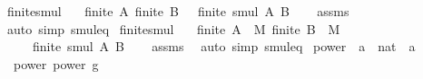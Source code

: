 \begin{isabellebody}
\endisatagproof
{\isafoldproof}%
%
\isadelimproof
\isanewline
%
\endisadelimproof
\isanewline
{}\isamarkupfalse%
\ finite{\isacharunderscore}{\kern0pt}smul{\isacharcolon}{\kern0pt}\isanewline
\ \ \ {\isachardoublequoteopen}finite\ A{\isachardoublequoteclose}\ {\isachardoublequoteopen}finite\ B{\isachardoublequoteclose}\ \ \ {\isachardoublequoteopen}finite\ {\isacharparenleft}{\kern0pt}smul\ A\ B{\isacharparenright}{\kern0pt}{\isachardoublequoteclose}\isanewline
%
\isadelimproof
\ \ %
\endisadelimproof
%
\isatagproof
{}\isamarkupfalse%
\ assms\ \isamarkupfalse%
\ {\isacharparenleft}{\kern0pt}auto\ simp{\isacharcolon}{\kern0pt}\ smul{\isacharunderscore}{\kern0pt}eq{\isacharparenright}{\kern0pt}%
\endisatagproof
{\isafoldproof}%
%
\isadelimproof
\isanewline
%
\endisadelimproof
\isanewline
{}\isamarkupfalse%
\ finite{\isacharunderscore}{\kern0pt}smul{\isacharprime}{\kern0pt}{\isacharcolon}{\kern0pt}\isanewline
\ \ \ {\isachardoublequoteopen}finite\ {\isacharparenleft}{\kern0pt}A\ {\isasyminter}\ M{\isacharparenright}{\kern0pt}{\isachardoublequoteclose}\ {\isachardoublequoteopen}finite\ {\isacharparenleft}{\kern0pt}B\ {\isasyminter}\ M{\isacharparenright}{\kern0pt}{\isachardoublequoteclose}\isanewline
\ \ \ \ \ {\isachardoublequoteopen}finite\ {\isacharparenleft}{\kern0pt}smul\ A\ B{\isacharparenright}{\kern0pt}{\isachardoublequoteclose}\isanewline
%
\isadelimproof
\ \ %
\endisadelimproof
%
\isatagproof
{}\isamarkupfalse%
\ assms\ \isamarkupfalse%
\ {\isacharparenleft}{\kern0pt}auto\ simp{\isacharcolon}{\kern0pt}\ smul{\isacharunderscore}{\kern0pt}eq{\isacharparenright}{\kern0pt}%
\endisatagproof
{\isafoldproof}%
%
\isadelimproof
%
\endisadelimproof
%
\isadelimdocument
%
\endisadelimdocument
%
\isatagdocument
%
\isamarkuptrue%
%
\endisatagdocument
{\isafolddocument}%
%
\isadelimdocument
%
\endisadelimdocument
{}\isamarkupfalse%
\ power\ {\isacharcolon}{\kern0pt}{\isacharcolon}{\kern0pt}\ {\isachardoublequoteopen}{\isacharprime}{\kern0pt}a\ {\isasymRightarrow}\ nat\ {\isasymRightarrow}\ {\isacharprime}{\kern0pt}a{\isachardoublequoteclose}\ {\isacharparenleft}{\kern0pt}\ {\isachardoublequoteopen}{\isacharcircum}{\kern0pt}{\isachardoublequoteclose}\ {}{}{}{\isacharparenright}{\kern0pt}\isanewline
\ \ \isanewline
\ \ power{}{\isacharcolon}{\kern0pt}\ {\isachardoublequoteopen}power\ g\ {}\ {\isacharequal}{\kern0pt}\ {\isasymone}{\isachardoublequoteclose}\isanewline

\end{isabellebody}
